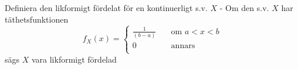  Definiera den likformigt fördelat för en kontinuerligt s.v. $X$ - Om den s.v. $X$ har täthetsfunktionen \[ f_X(x) =\begin{cases}\frac{1}{(b-a)} & \quad \text{om } a < x < b\\ 0  & \quad  \text{annars}\\ \end{cases} \] sägs $X$ vara likformigt fördelad